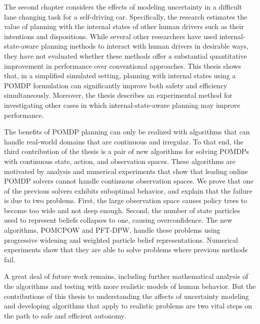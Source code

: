 \documentclass[12pt]{report}
\begin{document}
The second chapter considers the effects of modeling uncertainty in a difficult lane changing task for a self-driving car.
Specifically, the research estimates the value of planning with the internal states of other human drivers such as their intentions and dispositions.
While several other researchers have used internal-state-aware planning methods to interact with human drivers in desirable ways, they have not evaluated whether these methods offer a substantial quantitative improvement in performance over conventional approaches.
This thesis shows that, in a simplified simulated setting, planning with internal states using a POMDP formulation can significantly improve both safety and efficiency simultaneously.
Moreover, the thesis describes an experimental method for investigating other cases in which internal-state-aware planning may improve performance.

The benefits of POMDP planning can only be realized with algorithms that can handle real-world domains that are continuous and irregular.
To that end, the third contribution of the thesis is a pair of new algorithms for solving POMDPs with continuous state, action, and observation spaces.
These algorithms are motivated by analysis and numerical experiments that show that leading online POMDP solvers cannot handle continuous observation spaces.
We prove that one of the previous solvers exhibits suboptimal behavior, and explain that the failure is due to two problems.
First, the large observation space causes policy trees to become too wide and not deep enough.
Second, the number of state particles used to represent beliefs collapses to one, causing overconfidence.
The new algorithms, POMCPOW and PFT-DPW, handle these problems using progressive widening and weighted particle belief representations.
Numerical experiments show that they are able to solve problems where previous methods fail.

A great deal of future work remains, including further mathematical analysis of the algorithms and testing with more realistic models of human behavior. But the contributions of this thesis to understanding the affects of uncertainty modeling and developing algorithms that apply to realistic problems are two vital steps on the path to safe and efficient autonomy.


% 
\end{document}
